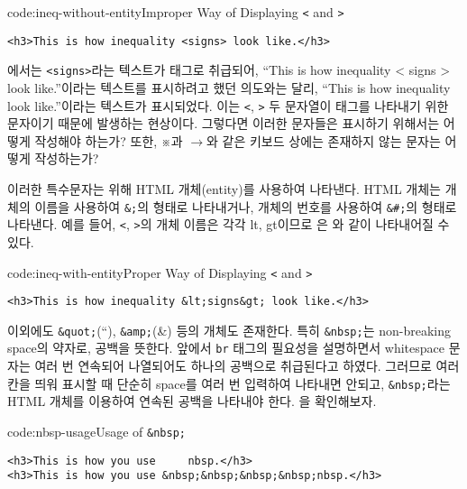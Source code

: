 \begin{codeenv}{code:ineq-without-entity}{Improper Way of Displaying \texttt{<} and \texttt{>}}\begin{verbatim}
<h3>This is how inequality <signs> look like.</h3>
\end{verbatim}
\end{codeenv}

에서는 \texttt{<signs>}라는 텍스트가 태그로 취급되어, ``This is how inequality {\textless} signs {\textgreater} look like.''이라는 텍스트를 표시하려고 했던 의도와는 달리, ``This is how inequality look like.''이라는 텍스트가 표시되었다. 이는 \texttt{<}, \texttt{>} 두 문자열이 태그를 나타내기 위한 문자이기 때문에 발생하는 현상이다. 그렇다면 이러한 문자들은 표시하기 위해서는 어떻게 작성해야 하는가? 또한, ※과 $\rightarrow$와 같은 키보드 상에는 존재하지 않는 문자는 어떻게 작성하는가?

이러한 특수문자는 위해 HTML 개체(entity)를 사용하여 나타낸다. HTML 개체는 개체의 이름을 사용하여 \texttt{\&<entity-name>;}의 형태로 나타내거나, 개체의 번호를 사용하여 \texttt{\&\#<entity-number>;}의 형태로 나타낸다. 예를 들어, \texttt{<}, \texttt{>}의 개체 이름은 각각 lt, gt이므로 은 와 같이 나타내어질 수 있다.

\begin{codeenv}{code:ineq-with-entity}{Proper Way of Displaying \texttt{<} and \texttt{>}}\begin{verbatim}
<h3>This is how inequality &lt;signs&gt; look like.</h3>
\end{verbatim}
\end{codeenv}

이외에도 \texttt{\&quot;}(``), \texttt{\&amp;}(\&) 등의 개체도 존재한다. 특히 \texttt{\&nbsp;}는 non-breaking space의 약자로, 공백을 뜻한다. 앞에서 \texttt{br} 태그의 필요성을 설명하면서 whitespace 문자는 여러 번 연속되어 나열되어도 하나의 공백으로 취급된다고 하였다. 그러므로 여러 칸을 띄워 표시할 때 단순히 space를 여러 번 입력하여 나타내면 안되고, \texttt{\&nbsp;}라는 HTML 개체를 이용하여 연속된 공백을 나타내야 한다. 을 확인해보자.

\begin{codeenv}{code:nbsp-usage}{Usage of \texttt{\&nbsp;}}\begin{verbatim}
<h3>This is how you use     nbsp.</h3>
<h3>This is how you use &nbsp;&nbsp;&nbsp;&nbsp;nbsp.</h3>
\end{verbatim}
\end{codeenv}

